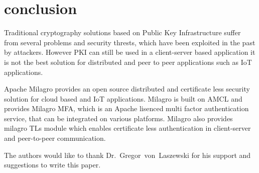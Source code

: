 \section{conclusion}
Traditional cryptography solutions based on Public Key Infrastructure
suffer from several problems and security thrests, which have been
exploited in the past by attackers. However PKI can still be used in a
client-server based application it is not the best solution for
distributed and peer to peer applications such as IoT applications.

Apache Milagro provides an open source distributed and certificate
less security solution for cloud based and IoT applications. Milagro
is built on AMCL and provides Milagro MFA, which is an Apache lisenced
multi factor authentication service, that can be integrated on various
platforms. Milagro also provides milagro TLs module which enables
certificate less authentication in client-server and peer-to-peer
communication.

\begin{acks}

  The authors would like to thank Dr.~Gregor~von~Laszewski for his
  support and suggestions to write this paper.

\end{acks}




 
